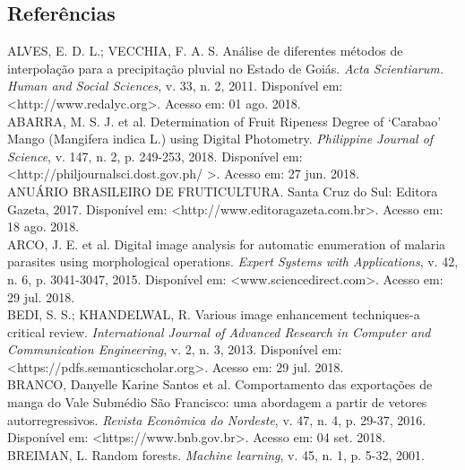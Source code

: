 \begin{center}
\chapter*{Referências}
\end{center}

\noindent ALVES, E. D. L.; VECCHIA, F. A. S. Análise de diferentes métodos de interpolação para a precipitação pluvial no Estado de Goiás. \textit{Acta Scientiarum. Human and Social Sciences}, v. 33, n. 2, 2011. Disponível em: <http://www.redalyc.org>. Acesso em: 01 ago. 2018.
\\

\noindent ABARRA, M. S. J. et al. Determination of Fruit Ripeness Degree of ‘Carabao’ Mango (Mangifera indica L.) using Digital Photometry. \textit{Philippine Journal of Science}, v. 147, n. 2, p. 249-253, 2018. Disponível em: <http://philjournalsci.dost.gov.ph/ >. Acesso em: 27 jun. 2018.
\\

\noindent ANUÁRIO BRASILEIRO DE FRUTICULTURA. Santa Cruz do Sul: Editora Gazeta, 2017. Disponível em: <http://www.editoragazeta.com.br>. Acesso em: 18 ago. 2018.
\\

\noindent ARCO, J. E. et al. Digital image analysis for automatic enumeration of malaria parasites using morphological operations. \textit{Expert Systems with Applications}, v. 42, n. 6, p. 3041-3047, 2015. Disponível em: <www.sciencedirect.com>. Acesso em: 29 jul. 2018.
\\

\noindent BEDI, S. S.; KHANDELWAL, R. Various image enhancement techniques-a critical review. \textit{International Journal of Advanced Research in Computer and Communication Engineering}, v. 2, n. 3, 2013. Disponível em: <https://pdfs.semanticscholar.org>. Acesso em: 29 jul. 2018.
\\

\noindent BRANCO, Danyelle Karine Santos et al. Comportamento das exportações de manga do Vale Submédio São Francisco: uma abordagem a partir de vetores autorregressivos. \textit{Revista Econômica do Nordeste}, v. 47, n. 4, p. 29-37, 2016. Disponível em: <https://www.bnb.gov.br>. Acesso em: 04 set. 2018.
\\

\noindent BREIMAN, L. Random forests. \textit{Machine learning}, v. 45, n. 1, p. 5-32, 2001.
\\

